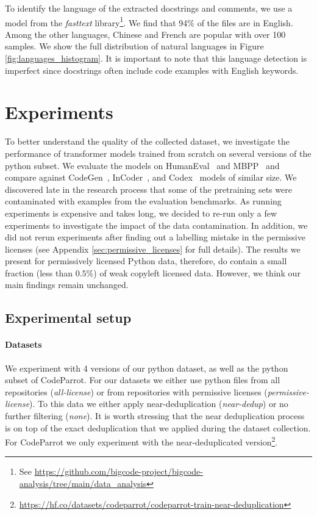 To identify the language of the extracted docstrings and comments, we use a model from the \textit{fasttext} library\footnote{See  \url{https://github.com/bigcode-project/bigcode-analysis/tree/main/data_analysis}}. We find that 94\% of the files are in English. Among the other languages, Chinese and French are popular with over 100 samples. We show the full distribution of natural languages in Figure \ref{fig:languages_histogram}. It is important to note that this language detection is imperfect since docstrings often include code examples with English keywords. 

\section{Experiments}
To better understand the quality of the collected dataset, we investigate the performance of transformer models trained from scratch on several versions of the python subset. We evaluate the models on HumanEval~\citep{chen2021codex} and MBPP~\citep{austin2021program} and compare against CodeGen~\citep{Nijkamp2022ACP}, InCoder~\citep{fried2022incoder}, and Codex~\citep{chen2021codex} models of similar size. We discovered late in the research process that some of the pretraining sets were contaminated with examples from the evaluation benchmarks. As running experiments is expensive and takes long, we decided to re-run only a few experiments to investigate the impact of the data contamination. In addition, we did not rerun experiments after finding out a labelling mistake in the permissive licenses (see Appendix \ref{sec:permissive_licenses} for full details). The results we present for permissively licensed Python data, therefore, do contain a small fraction (less than $0.5$\%) of weak copyleft licensed data. However, we think our main findings remain unchanged. 

\subsection{Experimental setup}

\paragraph{Datasets} We experiment with 4 versions of our python dataset, as well as the python subset of CodeParrot. For our datasets we either use python files from all repositories (\emph{all-license}) or from repositories with permissive licenses (\emph{permissive-license}). To this data we either apply near-deduplication (\emph{near-dedup}) or no further filtering (\emph{none}). It is worth stressing that the near deduplication process is on top of the exact deduplication that we applied during the dataset collection. For CodeParrot we only experiment with the near-deduplicated version\footnote{\url{https://hf.co/datasets/codeparrot/codeparrot-train-near-deduplication}}.  

